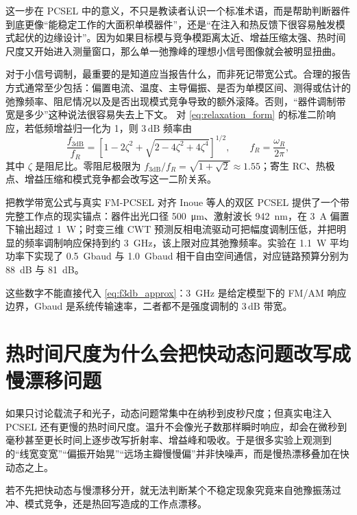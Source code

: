 这一步在 PCSEL 中的意义，不只是教读者认识一个标准术语，而是帮助判断器件到底更像“能稳定工作的大面积单模器件”，还是“在注入和热反馈下很容易触发模式起伏的边缘设计”。因为如果目标模与竞争模距离太近、增益压缩太强、热时间尺度又开始进入测量窗口，那么单一弛豫峰的理想小信号图像就会被明显扭曲。

对于小信号调制，最重要的是知道应当报告什么，而非死记带宽公式。合理的报告方式通常至少包括：偏置电流、温度、主导偏振、是否为单模区间、测得或估计的弛豫频率、阻尼情况以及是否出现模式竞争导致的额外滚降。否则，“器件调制带宽是多少”这种说法很容易失去上下文。
对 \cref{eq:relaxation_form} 的标准二阶响应，若低频增益归一化为 1，则 $3\,\mathrm{dB}$ 频率由
\begin{equation}
\frac{f_{3\mathrm{dB}}}{f_R}
=
\left[
1-2\zeta^2+\sqrt{2-4\zeta^2+4\zeta^4}
\right]^{1/2},
\qquad f_R=\frac{\omega_R}{2\pi},
\label{eq:f3db_approx}
\end{equation}
其中 $\zeta$ 是阻尼比。零阻尼极限为 $f_{3\mathrm{dB}}/f_R=\sqrt{1+\sqrt2}\approx1.55$；寄生 RC、热极点、增益压缩和模式竞争都会改写这一二阶关系。

\begin{ApplicationBox}{把教学带宽公式与真实 FM-PCSEL 对齐}
Inoue 等人的双区 PCSEL 提供了一个带完整工作点的现实锚点：器件出光口径 \SI{500}{\micro\meter}、激射波长 \SI{942}{nm}，在 \SI{3}{A} 偏置下输出超过 \SI{1}{W}；时变三维 CWT 预测反相电流驱动可把幅度调制压低，并把明显的频率调制响应保持到约 \SI{3}{GHz}，该上限对应其弛豫频率\cite{inoue2025fmpcsel}。实验在 \SI{1.1}{W} 平均功率下实现了 \SI{0.5}{Gbaud} 与 \SI{1.0}{Gbaud} 相干自由空间通信，对应链路预算分别为 \SI{88}{dB} 与 \SI{81}{dB}。

这些数字不能直接代入 \cref{eq:f3db_approx}：\SI{3}{GHz} 是给定模型下的 FM/AM 响应边界，Gbaud 是系统传输速率，二者都不是强度调制的 $3\,\mathrm{dB}$ 带宽。
\end{ApplicationBox}

\section{热时间尺度为什么会把快动态问题改写成慢漂移问题}
如果只讨论载流子和光子，动态问题常集中在纳秒到皮秒尺度；但真实电注入 PCSEL 还有更慢的热时间尺度。温升不会像光子数那样瞬时响应，却会在微秒到毫秒甚至更长时间上逐步改写折射率、增益峰和吸收。于是很多实验上观测到的“线宽变宽”“偏振开始晃”“远场主瓣慢慢偏”并非快噪声，而是慢热漂移叠加在快动态之上。

若不先把快动态与慢漂移分开，就无法判断某个不稳定现象究竟来自弛豫振荡过冲、模式竞争，还是热回写造成的工作点漂移。

